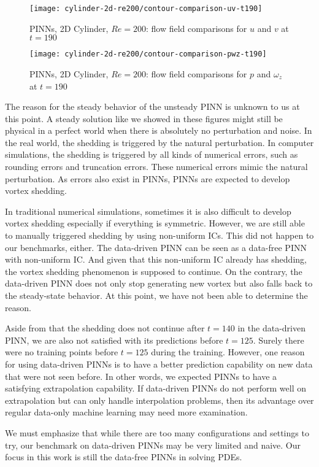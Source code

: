 \begin{figure}[hbt!]
    \texttt{[image: cylinder-2d-re200/contour-comparison-uv-t190]}
    \caption{PINNs, 2D Cylinder, $Re=200$: flow field comparisons for $u$ and $v$ at $t=190$}
    \label{fig:cylinder-re200-contour-uv-t190}
\end{figure}

\begin{figure}[hbt!]
    \texttt{[image: cylinder-2d-re200/contour-comparison-pwz-t190]}
    \caption{PINNs, 2D Cylinder, $Re=200$: flow field comparisons for $p$ and $\omega_z$ at $t=190$}
    \label{fig:cylinder-re200-contour-pwz-t190}
\end{figure}

The reason for the steady behavior of the unsteady PINN is unknown to us at this point.
A steady solution like we showed in these figures might still be physical in a perfect world when there is absolutely no perturbation and noise.
In the real world, the shedding is triggered by the natural perturbation.
In computer simulations, the shedding is triggered by all kinds of numerical errors, such as rounding errors and truncation errors.
These numerical errors mimic the natural perturbation.
As errors also exist in PINNs, PINNs are expected to develop vortex shedding.

In traditional numerical simulations, sometimes it is also difficult to develop vortex shedding especially if everything is symmetric.
However, we are still able to manually triggered shedding by using non-uniform ICs.
This did not happen to our benchmarks, either.
The data-driven PINN can be seen as a data-free PINN with non-uniform IC.
And given that this non-uniform IC already has shedding, the vortex shedding phenomenon is supposed to continue.
On the contrary, the data-driven PINN does not only stop generating new vortex but also falls back to the steady-state behavior.
At this point, we have not been able to determine the reason.

Aside from that the shedding does not continue after $t=140$ in the data-driven PINN, we are also not satisfied with its predictions before $t=125$.
Surely there were no training points before $t=125$ during the training.
However, one reason for using data-driven PINNs is to have a better prediction capability on new data that were not seen before.
In other words, we expected PINNs to have a satisfying extrapolation capability.
If data-driven PINNs do not perform well on extrapolation but can only handle interpolation problems, then its advantage over regular data-only machine learning may need more examination.

We must emphasize that while there are too many configurations and settings to try, our benchmark on data-driven PINNs may be very limited and naive.
Our focus in this work is still the data-free PINNs in solving PDEs.
